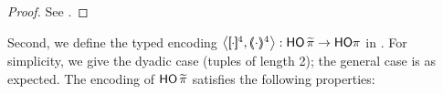 \documentclass[runningheads]{llncs}
\begin{document}
{{\begin{proof}
See .
\end{proof}




%

Second, we define the typed encoding
	$\enco{\map{\cdot}^{4}, \mapt{\cdot}^{4}}: \PHOp \to \HOp$ 
in .
For simplicity, we give the dyadic case (tuples of length 2);
the general case is as expected.
The encoding of $\mathsf{HO}\,{\widetilde{\pi}}$  satisfies the following properties:


}}
\end{document}
